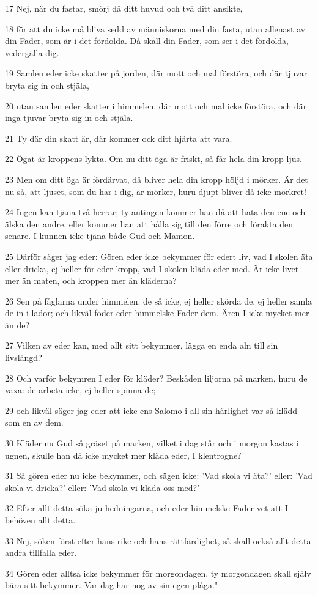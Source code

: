 \par 17 Nej, när du fastar, smörj då ditt huvud och två ditt ansikte,
\par 18 för att du icke må bliva sedd av människorna med din fasta, utan allenast av din Fader, som är i det fördolda. Då skall din Fader, som ser i det fördolda, vedergälla dig.
\par 19 Samlen eder icke skatter på jorden, där mott och mal förstöra, och där tjuvar bryta sig in och stjäla,
\par 20 utan samlen eder skatter i himmelen, där mott och mal icke förstöra, och där inga tjuvar bryta sig in och stjäla.
\par 21 Ty där din skatt är, där kommer ock ditt hjärta att vara.
\par 22 Ögat är kroppens lykta. Om nu ditt öga är friskt, så får hela din kropp ljus.
\par 23 Men om ditt öga är fördärvat, då bliver hela din kropp höljd i mörker. Är det nu så, att ljuset, som du har i dig, är mörker, huru djupt bliver då icke mörkret!
\par 24 Ingen kan tjäna två herrar; ty antingen kommer han då att hata den ene och älska den andre, eller kommer han att hålla sig till den förre och förakta den senare. I kunnen icke tjäna både Gud och Mamon.
\par 25 Därför säger jag eder: Gören eder icke bekymmer för edert liv, vad I skolen äta eller dricka, ej heller för eder kropp, vad I skolen kläda eder med. Är icke livet mer än maten, och kroppen mer än kläderna?
\par 26 Sen på fåglarna under himmelen: de så icke, ej heller skörda de, ej heller samla de in i lador; och likväl föder eder himmelske Fader dem. Ären I icke mycket mer än de?
\par 27 Vilken av eder kan, med allt sitt bekymmer, lägga en enda aln till sin livslängd?
\par 28 Och varför bekymren I eder för kläder? Beskåden liljorna på marken, huru de växa: de arbeta icke, ej heller spinna de;
\par 29 och likväl säger jag eder att icke ens Salomo i all sin härlighet var så klädd som en av dem.
\par 30 Kläder nu Gud så gräset på marken, vilket i dag står och i morgon kastas i ugnen, skulle han då icke mycket mer kläda eder, I klentrogne?
\par 31 Så gören eder nu icke bekymmer, och sägen icke: 'Vad skola vi äta?' eller: 'Vad skola vi dricka?' eller: 'Vad skola vi kläda oss med?'
\par 32 Efter allt detta söka ju hedningarna, och eder himmelske Fader vet att I behöven allt detta.
\par 33 Nej, söken först efter hans rike och hans rättfärdighet, så skall också allt detta andra tillfalla eder.
\par 34 Gören eder alltså icke bekymmer för morgondagen, ty morgondagen skall själv bära sitt bekymmer. Var dag har nog av sin egen plåga."

